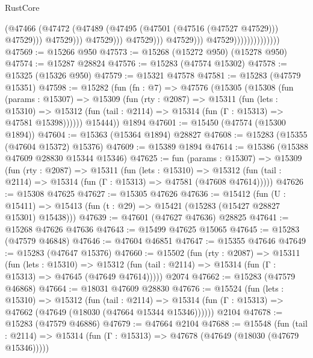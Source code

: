 \begin{lexlean}{RustCore}
\begin{coremodule}
                                                      (@47466
                                                        (@47472
                                                          (@47489
                                                            (@47495
                                                              (@47501 (@47516 (@47527 @47529)))
                                                              @47529)))
                                                        @47529)))
                                                  @47529)))
                                            @47529)))
                                      @47529)))
                                @47529))))))))))))))
@47569 := @15266 @950
@47573 := @15268 (@15272 @950) (@15278 @950)
@47574 := @15287 @28824
@47576 := @15283 (@47574 @15302)
@47578 := @15325 (@15326 @950)
@47579 := @15321 @47578
@47581 := @15283 (@47579 @15351)
@47598 := @15282
    (fun (fn : @7) =>
    @47576
      (@15305
        (@15308
          (fun (params : @15307) =>
          @15309
            (fun (rty : @2087) =>
            @15311
              (fun (lets : @15310) =>
              @15312 (fun (tail : @2114) => @15314 (fun (Γ : @15313) => @47581 @15398))))))
        @15444))
    @1894
@47601 := @15450 (@47574 (@15300 @1894))
@47604 := @15363 (@15364 @1894) @28827
@47608 := @15283 (@15355 (@47604 @15372) @15376)
@47609 := @15389 @1894
@47614 := @15386 (@15388 @47609 @28830 @15344 @15346)
@47625 := fun (params : @15307) =>
  @15309
    (fun (rty : @2087) =>
    @15311
      (fun (lets : @15310) =>
      @15312 (fun (tail : @2114) => @15314 (fun (Γ : @15313) => @47581 (@47608 @47614)))))
@47626 := @15308 @47625
@47627 := @15305 @47626
@47636 := @15412
    (fun (U : @15411) => @15413 (fun (t : @29) => @15421 (@15283 (@15427 @28827 @15301) @15438)))
@47639 := @47601 (@47627 @47636) @28825
@47641 := @15268 @47626 @47636
@47643 := @15499 @47625 @15065
@47645 := @15283 (@47579 @46848)
@47646 := @47604 @46851
@47647 := @15355 @47646
@47649 := @15283 (@47647 @15376)
@47660 := @15502
    (fun (rty : @2087) =>
    @15311
      (fun (lets : @15310) =>
      @15312 (fun (tail : @2114) => @15314 (fun (Γ : @15313) => @47645 (@47649 @47614)))))
    @2074
@47662 := @15283 (@47579 @46868)
@47664 := @18031 @47609 @28830
@47676 := @15524
    (fun (lets : @15310) =>
    @15312
      (fun (tail : @2114) =>
      @15314 (fun (Γ : @15313) => @47662 (@47649 (@18030 (@47664 @15344 @15346))))))
    @2104
@47678 := @15283 (@47579 @46886)
@47679 := @47664 @2104
@47688 := @15548
    (fun (tail : @2114) => @15314 (fun (Γ : @15313) => @47678 (@47649 (@18030 (@47679 @15346)))))

\end{coremodule}
\end{lexlean}
